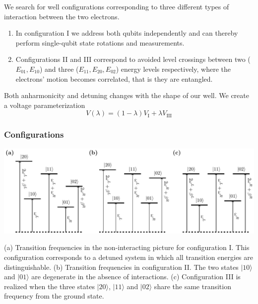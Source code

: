 \documentclass{beamer}
\begin{document}
\begin{frame}

We search for well configurations corresponding to three different types of interaction between the two electrons.

\begin{enumerate}
\item In configuration I we address both qubits independently and can thereby perform single-qubit state rotations and measurements.

\item Configurations II and III correspond to avoided level crossings between two ($E_{01}, E_{10}$) and three ($E_{11}, E_{20}, E_{02}$) energy levels respectively, where the electrons' motion becomes correlated, that is they are entangled. 
\end{enumerate}

\noindent
Both anharmonicity and detuning changes with the shape of our well.
We create a voltage parameterization
\begin{equation}
V(\lambda) = (1-\lambda)V_\mathrm{I} + \lambda V_\mathrm{III}
\end{equation}
\end{frame}

\begin{frame}
\frametitle{Configurations}
\centerline{\includegraphics[width=0.8\linewidth]{qcfigures/states.pdf}}
(a) Transition frequencies in the non-interacting picture for configuration I. This configuration corresponds to a detuned
system in which all transition energies are distinguishable. (b) Transition
frequencies in configuration II. The two states $\vert 10\rangle$ and $\vert 01\rangle$ are degenerate in the
absence of interactions. (c)
Configuration III is realized when the three states $\vert 20\rangle$, $\vert 11\rangle$ and $\vert 02\rangle$ share the same transition frequency from the ground
state. 
\end{frame}
\end{document}
